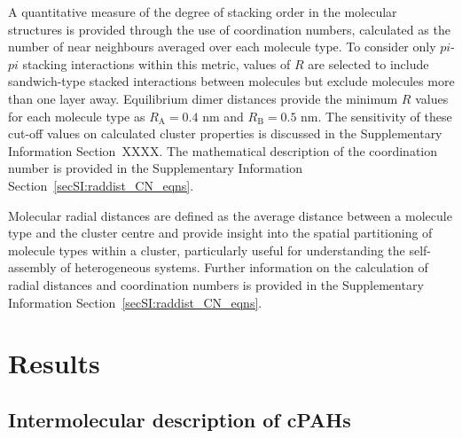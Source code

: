 A quantitative measure of the degree of stacking order in the molecular structures is provided through the use of coordination numbers, calculated as the number of near neighbours averaged over each molecule type. To consider only $pi$-$pi$ stacking interactions within this metric, values of $R$ are selected to include sandwich-type stacked interactions between molecules but exclude molecules more than one layer away. Equilibrium dimer distances provide the minimum $R$ values for each molecule type as $R_{\text{A}} = 0.4$ nm and $R_{\text{B}} = 0.5$ nm. The sensitivity of these cut-off values on calculated cluster properties is discussed in the Supplementary Information Section~XXXX. The mathematical description of the coordination number is provided in the Supplementary Information Section~\ref{secSI:raddist_CN_eqns}.

Molecular radial distances are defined as the average distance between a molecule type and the cluster centre and provide insight into the spatial partitioning of molecule types within a cluster, particularly useful for understanding the self-assembly of heterogeneous systems. Further information on the calculation of radial distances and coordination numbers is provided in the Supplementary Information Section~\ref{secSI:raddist_CN_eqns}.



\section{Results}

\subsection{Intermolecular description of cPAHs} 

